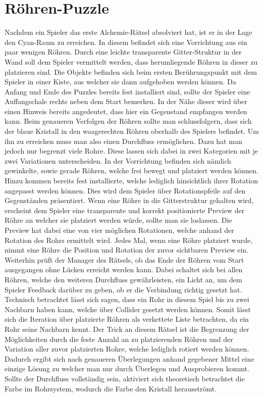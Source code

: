\section{Röhren-Puzzle}
Nachdem ein Spieler das erste Alchemie-Rätsel absolviert hat, ist er in der Lage den Cyan-Raum zu erreichen. In diesem befindet sich eine Vorrichtung aus ein paar wenigen Röhren. Durch eine leichte transparente Gitter-Struktur in der Wand soll dem Spieler vermittelt werden, dass herumliegende Röhren in dieser zu platzieren sind. Die Objekte befinden sich beim ersten Berührungspunkt mit dem Spieler in einer Kiste, aus welcher sie dann aufgehoben werden können. Da Anfang und Ende des Puzzles bereits fest installiert sind, sollte der Spieler eine Auffangschale rechts neben dem Start bemerken. In der Nähe dieser wird über einen Hinweis bereits angedeutet, dass hier ein Gegenstand empfangen werden kann. Beim genaueren Verfolgen der Röhren sollte man schlussfolgern, dass sich der blaue Kristall in den waagerechten Röhren oberhalb des Spielers befindet. Um ihn zu erreichen muss man also einen Durchfluss ermöglichen. Dazu hat man jedoch nur begrenzt viele Rohre. Diese lassen sich dabei in zwei Kategorien mit je zwei Variationen unterscheiden. In der Vorrichtung befinden sich nämlich gewinkelte, sowie gerade Röhren, welche frei bewegt und platziert werden können. Hinzu kommen bereits fest installierte, welche lediglich hinsichtlich ihrer Rotation angepasst werden können. Dies wird dem Spieler über Rotationspfeile auf den Gegenständen präsentiert. Wenn eine Röhre in die Gitterstruktur gehalten wird, erscheint dem Spieler eine transparente und korrekt positionierte Preview der Röhre an welcher sie platziert werden würde, sollte man sie loslassen. Die Preview hat dabei eine von vier möglichen Rotationen, welche anhand der Rotation des Rohrs ermittelt wird. Jedes Mal, wenn eine Röhre platziert wurde, nimmt eine Röhre die Position und Rotation der zuvor sichtbaren Preview ein. Weiterhin prüft der Manager des Rätsels, ob das Ende der Röhren vom Start ausgegangen ohne Lücken erreicht werden kann. Dabei schaltet sich bei allen Röhren, welche den weiteren Durchfluss gewährleisten, ein Licht an, um dem Spieler Feedback darüber zu geben, ob er die Verbindung richtig gesetzt hat. Technisch betrachtet lässt sich sagen, dass ein Rohr in diesem Spiel bis zu zwei Nachbarn haben kann, welche über Collider gesetzt werden können. Somit lässt sich die Iteration über platzierte Röhren als verkettete Liste betrachten, da ein Rohr seine Nachbarn kennt. Der Trick an diesem Rätsel ist die Begrenzung der Möglichkeiten durch die feste Anzahl an zu platzierenden Röhren und der Variation aller zuvor platzierten Rohre, welche lediglich rotiert werden können. Dadurch ergibt sich nach genaueren Überlegungen anhand gegebener Mittel eine einzige Lösung zu welcher man nur durch Überlegen und Ausprobieren kommt.\\
Sollte der Durchfluss vollständig sein, aktiviert sich theoretisch betrachtet die Farbe im Rohrsystem, wodurch die Farbe den Kristall herausströmt.

